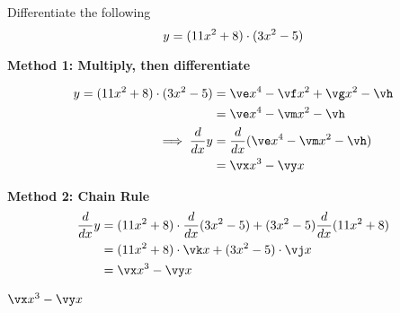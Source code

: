

\MULTIPLY\va\vc\ve
\MULTIPLY\va\vd\vf
\MULTIPLY\vb\vc\vg
\MULTIPLY\vb\vd\vh

\SUBTRACT\vf\vg\vm
\MULTIPLY{}\vx
\MULTIPLY{}\vy

\MULTIPLY{}\vj
\MULTIPLY{}\vk

\question[1] Differentiate the following 
  \[ y = (11 x^2 + 8)\cdot(3 x^2 -5) \]


\begin{solution}[\halfpage]
  \textbf{Method 1: Multiply, then differentiate}

	\begin{align}
    y = (\va x^2+\vb)\cdot (\vc x^2 - \vd) &= \ve x^4 -\vf x^2 + \vg x^2 -\vh \\
    & = \ve x^4 - \vm x^2 - \vh \\
    \implies \dfrac{d}{dx}y &= \dfrac{d}{dx}(\ve x^4 - \vm x^2 - \vh ) \\
      &= \vx x^3 - \vy x
	\end{align}

  \textbf{Method 2: Chain Rule} 
  \begin{align}
    \dfrac{d}{dx} y &= (\va x^2 + \vb)\cdot\dfrac{d}{dx}(\vc x^2 - \vd) + (\vc x^2 - \vd)\dfrac{d}{dx}(\va x^2 + \vb) \\
     &= (\va x^2 + \vb)\cdot\vk x + (\vc x^2-\vd)\cdot \vj x \\
     &= \vx x^3-\vy x
  \end{align}
\end{solution}

\ifprintanswers\begin{codex}$\vx x^3-\vy x$\end{codex}\fi
